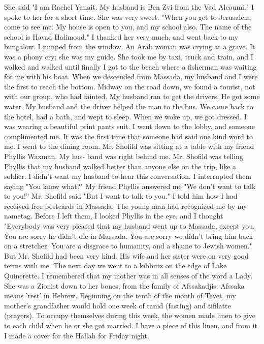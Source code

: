 She said "I 
am Rachel Yanait.
My husband is Ben Zvi from the Vad Aleoumi."
I spoke 
to her for a short time.
She was very sweet.
"When you get to Jerusalem, come to see me.
My house is open to you, and my school also.
The name of the school is Havad Halimoud."
I thanked her very much, and went back to my bungalow.
I jumped from the window.
An Arab woman was crying at a grave.
It was a phony cry; she was my 
guide.
She took me by taxi, truck and train, and I walked and walked until finally I got to the beach where a fisherman was waiting for me with his boat.
When we descended from Massada, my husband and I were the first to 
reach the bottom.
Midway on the road down, we found a tourist, not with 
our group, who had fainted.
My husband ran to get the drivers.
He got 
some water.
My husband and the driver helped the man to the bus.
We came back to the hotel, had a bath, and wept to sleep.
When we 
woke up, we got dressed.
I was wearing a beautiful print pants suit.
I went down to the lobby, and someone complimented me.
It was the first 
time that someone had said one kind word to me.
I went to the dining room.
Mr.
Shofild was sitting at a table with my friend Phyllis Waxman.
My hus-
band was right behind me.
Mr.
Shofild was telling Phyllis that my husband 
walked better than anyone else on the trip, like a soldier.
I didn't want 
my husband to hear this conversation.
I interrupted them saying "You 
know what?"
My friend Phyllis answered me "We don't want to talk to you!” 
Mr.
Shofild said "But I want to talk to you."
I told him how I had received free postcards in Massada.
The young man had recognized me by my nametag.
Before I left them, I looked Phyllis in the eye, and I thought "Everybody was very pleased that my husband went up to Massada, except you.
You are sorry he didn't die in Massada.
You are sorry we didn't bring him back on a stretcher.
You are a disgrace to humanity, and a shame to Jewish 
women."
But Mr.
Shofild had been very kind.
His wife and her sister were on very good terms with me.
The next day we went to a kibbutz on the edge of Lake Quinerette.
I remembered that my mother was in all senses of the word a Lady.
She was a Zionist down to her bones, from the family of Afssakadjis.
Afssaka means 'rest' in Hebrew.
Beginning on the tenth of the month of Tevet, my 
mother's grandfather would hold one week of tanid (fasting) and tifilatte (prayers).
To occupy themselves during this week, the women made linen 
to give to each child when he or she got married.
I have a piece of this 
linen, and from it I made a cover for the Hallah for Friday night.
